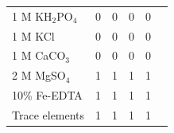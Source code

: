 \begin{table}[!h]
{\begin{tabular}{p{2.805cm}p{2cm}p{2cm}p{2cm}p{2cm}p{2cm}}
        1 M KH$_2$PO$_4$        & \multicolumn{1}{r}{0}         & \multicolumn{1}{r}{0}         & \multicolumn{1}{r}{0}         & \multicolumn{1}{r}{0}         &   \\
        1 M KCl                 & \multicolumn{1}{r}{0}         & \multicolumn{1}{r}{0}         & \multicolumn{1}{r}{0}         & \multicolumn{1}{r}{0}         &   \\
        1 M CaCO$_3$            & \multicolumn{1}{r}{0}         & \multicolumn{1}{r}{0}         & \multicolumn{1}{r}{0}         & \multicolumn{1}{r}{0}         &   \\
        2 M MgSO$_4$            & \multicolumn{1}{r}{1}         & \multicolumn{1}{r}{1}         & \multicolumn{1}{r}{1}         & \multicolumn{1}{r}{1}         &   \\
        10\% Fe-EDTA            & \multicolumn{1}{r}{1}         & \multicolumn{1}{r}{1}         & \multicolumn{1}{r}{1}         & \multicolumn{1}{r}{1}         &   \\
        Trace elements          & \multicolumn{1}{r}{1}         & \multicolumn{1}{r}{1}         & \multicolumn{1}{r}{1}         & \multicolumn{1}{r}{1}         &   \\
        \hline
\end{tabular}}
\end{table}
\clearpage

